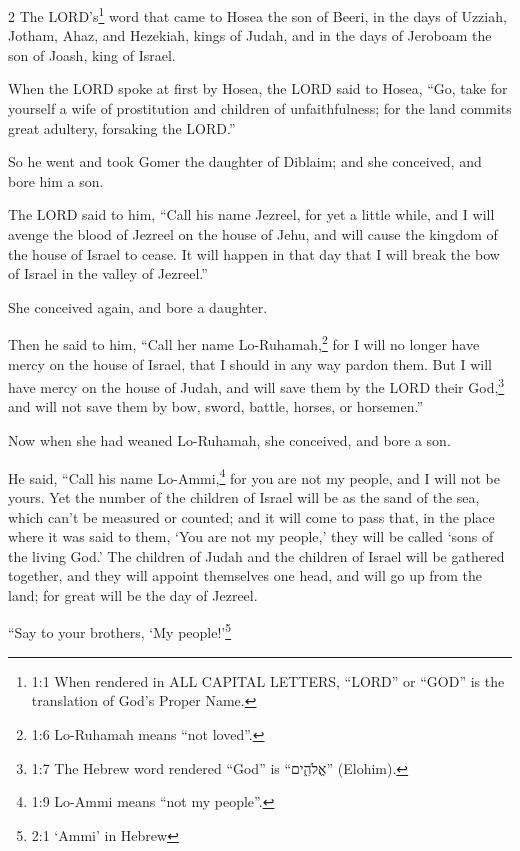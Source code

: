 \begin{multicols}{2}
\mychapter{} \myverse*{}The LORD’s\footnote{1:1 When rendered in ALL CAPITAL LETTERS, “LORD” or “GOD” is the translation of God’s Proper Name.}
word that came to Hosea the son of Beeri, in the days of Uzziah, Jotham, Ahaz, and Hezekiah, kings of
Judah, and in the days of Jeroboam the son of Joash, king of Israel.

\myverse{}When the LORD spoke at first by Hosea, the LORD said to Hosea,
“Go, take for yourself a wife of prostitution and children of unfaithfulness; for the land commits great
adultery, forsaking the LORD.”

\myverse{}So he went and took Gomer the daughter of Diblaim; and she conceived,
and bore him a son.

\myverse{}The LORD said to him, “Call his name Jezreel, for yet a little
while, and I will avenge the blood of Jezreel on the house of Jehu, and will cause the kingdom of the
house of Israel to cease.
\myverse{}It will happen in that day that I will break the bow of Israel in the valley
of Jezreel.”

\myverse{}She conceived again, and bore a daughter.

Then he said to him, “Call her name Lo-Ruhamah,\footnote{1:6 Lo-Ruhamah means “not loved”.} for I will no longer have mercy on the house of Israel,
that I should in any way pardon them.
\myverse{}But I will have mercy on the house of Judah, and will save them by the LORD
their God,\footnote{1:7 The Hebrew word rendered “God” is “אֱלֹהִ֑ים” (Elohim).} and will not save them
by bow, sword, battle, horses, or horsemen.”

\myverse{}Now when she had weaned Lo-Ruhamah, she conceived, and bore a son.

\myverse{}He said, “Call his name Lo-Ammi,\footnote{1:9 Lo-Ammi means “not my people”.} for you are not my people, and I will not be yours.
\myverse{}Yet the number of the children of Israel will be as the sand of the sea, which
can’t be measured or counted; and it will come to pass that, in the place where it was said to them, ‘You
are not my people,’ they will be called ‘sons of the living God.’
\myverse{}The children of Judah and the children of Israel will be gathered together,
and they will appoint themselves one head, and will go up from the land; for great will be the day of
Jezreel.


\mychapter{} \myverse*{}“Say to your brothers, ‘My people!’\footnote{2:1 ‘Ammi’ in Hebrew}


\end{multicols}
